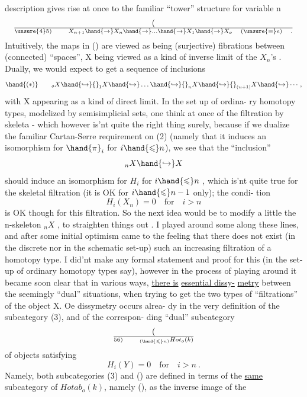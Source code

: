 
description gives rise at once to the familiar ``tower'' structure for
variable n
\[ (\over{\unsure{4}}{5}) \qquad X_{n+1} \hand{\to} X_n \hand{\to} \dots \hand{\to} X_1 \hand{\to} X_o \quad ( \unsure{=} e ) \quad . \]
Intuitively, the maps in () are viewed as being (surjective) fibrations
between (connected) ``spaces'', X being viewed as a kind of inverse limit
of the $X_n$'s . Dually, we would expect to get a sequence of inclusions
\[ \hand{(*)} \qquad {}_oX \hand{\hookrightarrow} {}_1X \hand{\hookrightarrow} \dots \hand{\hookrightarrow} {}_nX \hand{\hookrightarrow} {}_{(n+1)}X \hand{\hookrightarrow} \cdots , \]
with X appearing as  a kind of direct limit. In the set up of ordina-%
ry homotopy types, modelized by semisimplicial sets, one  think
at once of the filtration by skeleta - which however is'nt quite the
right thing surely, because if we dualize the familiar Cartan-Serre
requirement on (2) (namely that it induces an isomorphism for $\hand{\pi}_i$ for
$i \hand{\leqslant} n$), we see that the ``inclusion''
\[ {}_nX \hand{\hookrightarrow} X \]
should induce an isomorphism for $H_i$ for $i \hand{\leqslant} n$ , which is'nt quite
true for the skeletal filtration (it is OK for $i \hand{\leqslant} n-1$ only); the condi-%
tion
\[ H_i(X_n) = 0 \quad \text{for} \quad i > n \]
is OK though for this filtration. So the next idea would be to modify
a little the n-skeleton ${}_nX$ , to straighten things out .
I played around some along these lines, and after some initial optimism
came to the feeling that there does not exist (in the discrete nor in the
schematic set-up) such an increasing  filtration of a homotopy type. I
did'nt make any formal statement and proof for this (in the set-up of
ordinary homotopy types say), however in the process of playing around
it became soon clear that in various ways, \uline{there is}  \uline{essential dissy-}%
\uline{metry} between the seemingly ``dual'' situations, when trying to get the
two types of ``filtrations'' of the object X. Oe dissymetry occurs alrea-%
dy in the very definition of the subcategory (3), and of the correspon-%
ding ``dual''  subcategory
\[ (\over{5}{6}) \qquad {}_{(\hand{\leqslant} n)}Hot_o(k) \]
of objects satisfying
\[ H_i(Y) = 0 \quad \text{for} \quad i > n \ . \]
Namely, both subcategories (3) and () are defined in terms of the \uline{same}
subcategory of $Hotab_o(k)$, namely (), as the inverse image of the


